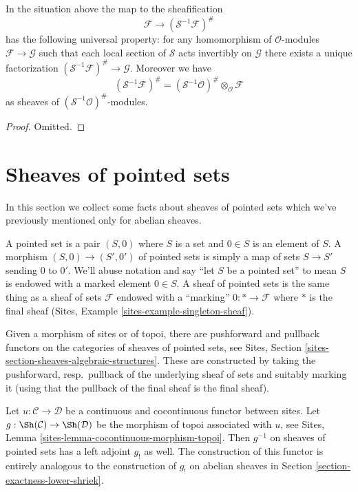 \begin{lemma}
\label{lemma-simple-invert-module}
In the situation above the map to the sheafification
$$
\mathcal{F} \longrightarrow (\mathcal{S}^{-1}\mathcal{F})^\#
$$
has the following universal property: for any homomorphism
of $\mathcal{O}$-modules $\mathcal{F} \to \mathcal{G}$ such
that each local section of $\mathcal{S}$ acts invertibly on $\mathcal{G}$
there exists a unique factorization
$(\mathcal{S}^{-1}\mathcal{F})^\# \to \mathcal{G}$.
Moreover we have
$$
(\mathcal{S}^{-1}\mathcal{F})^\#
=
(\mathcal{S}^{-1}\mathcal{O})^\# \otimes_\mathcal{O} \mathcal{F}
$$
as sheaves of $(\mathcal{S}^{-1}\mathcal{O})^\#$-modules.
\end{lemma}

\begin{proof}
Omitted.
\end{proof}









\section{Sheaves of pointed sets}
\label{section-pointed}

\noindent
In this section we collect some facts about sheaves of pointed sets
which we've previously mentioned only for abelian sheaves.

\medskip\noindent
A pointed set is a pair $(S, 0)$ where $S$ is a set and $0 \in S$
is an element of $S$. A morphism $(S, 0) \to (S', 0')$ of pointed sets
is simply a map of sets $S \to S'$ sending $0$ to $0'$. We'll abuse
notation and say ``let $S$ be a pointed set'' to mean $S$ is endowed
with a marked element $0 \in S$. A sheaf of pointed sets is
the same thing as a sheaf of sets $\mathcal{F}$ endowed with a
``marking'' $0 : * \to \mathcal{F}$ where $*$ is the final sheaf
(Sites, Example \ref{sites-example-singleton-sheaf}).

\medskip\noindent
Given a morphism of sites or of topoi, there are pushforward
and pullback functors on the categories of sheaves of pointed sets, see
Sites, Section \ref{sites-section-sheaves-algebraic-structures}.
These are constructed by taking the pushforward, resp.\ pullback
of the underlying sheaf of sets and suitably marking it (using
that the pullback of the final sheaf is the final sheaf).

\medskip\noindent
Let $u : \mathcal{C} \to \mathcal{D}$ be a continuous and cocontinuous
functor between sites. Let $g : \Sh(\mathcal{C}) \to \Sh(\mathcal{D})$
be the morphism of topoi associated with $u$, see
Sites, Lemma \ref{sites-lemma-cocontinuous-morphism-topoi}.
Then $g^{-1}$ on sheaves of pointed sets has a left adjoint $g_!$
as well. The construction of this functor is entirely analogous to
the construction of $g_!$ on abelian sheaves in
Section \ref{section-exactness-lower-shriek}.


